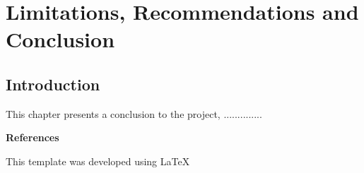 \chapter{Limitations, Recommendations and Conclusion}

\section{Introduction}
This chapter presents a conclusion to the project, .............. 
\newpage


\textbf{References}

\newpage
This template was developed using \LaTeX{}

